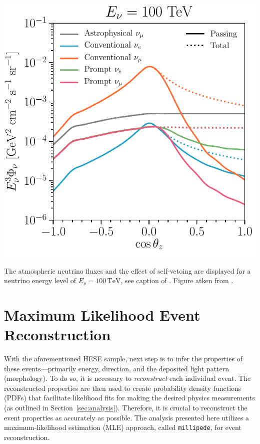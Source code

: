 \begin{marginfigure}
	\includegraphics{./figures/EventSample/fig1_fluxes_100.pdf}
	\caption{The atmospheric neutrino fluxes and the effect of self-vetoing are displayed for a neutrino energy level of \( E_\nu = 100 \, \text{TeV} \), see caption of . Figure atken from \cite{pass_frac}.}
\end{marginfigure}

\section{Maximum Likelihood Event Reconstruction}
\label{sec:reco}
With the aforementioned HESE sample, next step is to infer the properties of these events—primarily energy, direction, and the deposited light pattern (morphology). To do so, it is necessary to \emph{reconstruct} each individual event. The reconstructed properties are then used to create probability density functions (PDFs) that facilitate likelihood fits for making the desired physics measurements (as outlined in Section~\ref{sec:analysis}). Therefore, it is crucial to reconstruct the event properties as accurately as possible. The analysis presented here utilizes a maximum-likelihood estimation (MLE) approach, called \texttt{millipede}, for event reconstruction. 


